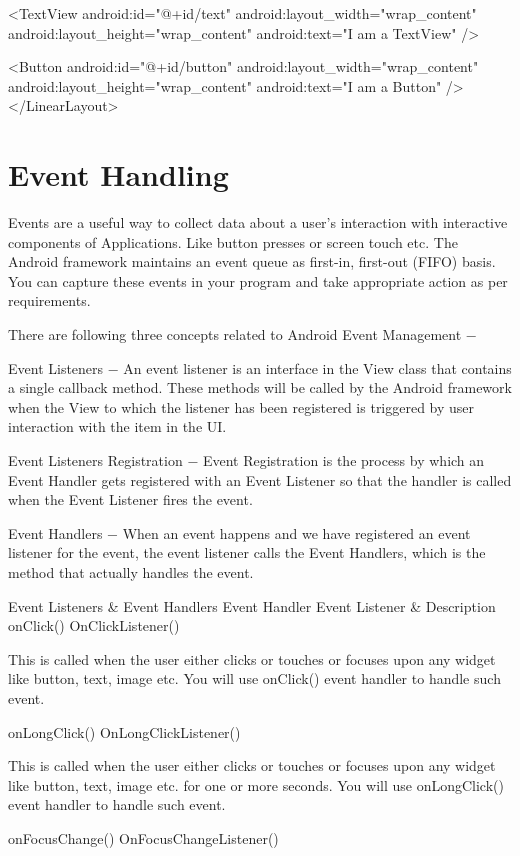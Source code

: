 \documentclass{fisatproject}
\begin{document}
   <TextView android:id="@+id/text"
      android:layout_width="wrap_content"
      android:layout_height="wrap_content"
      android:text="I am a TextView" />
   
   <Button android:id="@+id/button"
      android:layout_width="wrap_content"
      android:layout_height="wrap_content"
      android:text="I am a Button" />
</LinearLayout>
\section{Event Handling}
Events are a useful way to collect data about a user's interaction with interactive components of Applications. Like button presses or screen touch etc. The Android framework maintains an event queue as first-in, first-out (FIFO) basis. You can capture these events in your program and take appropriate action as per requirements.

There are following three concepts related to Android Event Management −

Event Listeners − An event listener is an interface in the View class that contains a single callback method. These methods will be called by the Android framework when the View to which the listener has been registered is triggered by user interaction with the item in the UI.

Event Listeners Registration − Event Registration is the process by which an Event Handler gets registered with an Event Listener so that the handler is called when the Event Listener fires the event.

Event Handlers − When an event happens and we have registered an event listener for the event, the event listener calls the Event Handlers, which is the method that actually handles the event.

Event Listeners & Event Handlers
Event Handler	Event Listener & Description
onClick()	
OnClickListener()

This is called when the user either clicks or touches or focuses upon any widget like button, text, image etc. You will use onClick() event handler to handle such event.

onLongClick()	
OnLongClickListener()

This is called when the user either clicks or touches or focuses upon any widget like button, text, image etc. for one or more seconds. You will use onLongClick() event handler to handle such event.

onFocusChange()	
OnFocusChangeListener()
\end{document}
